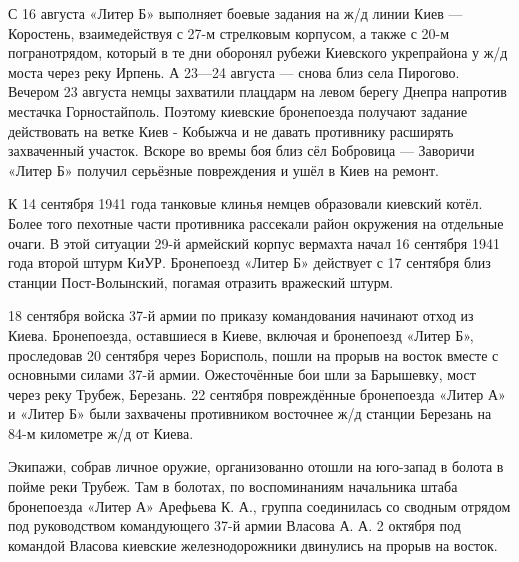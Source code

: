 С 16 августа «Литер Б» выполняет боевые задания на ж/д линии Киев — Коростень,
взаимедействуя с 27-м стрелковым корпусом, а также с 20-м погранотрядом,
который в те дни оборонял рубежи Киевского укрепрайона у ж/д моста через реку
Ирпень. А 23—24 августа — снова близ села Пирогово. Вечером 23 августа немцы
захватили плацдарм на левом берегу Днепра напротив местачка Горностайполь.
Поэтому киевские бронепоезда получают задание действовать на ветке Киев -
Кобыжча и не давать противнику расширять захваченный участок. Вскоре во времы
боя близ сёл Бобровица — Заворичи «Литер Б» получил серьёзные повреждения и
ушёл в Киев на ремонт\cite{Kajnaran2012}.

К 14 сентября 1941 года танковые клинья немцев образовали киевский котёл. Более
того пехотные части противника рассекали район окружения на отдельные очаги. В
этой ситуации 29-й армейский корпус вермахта начал 16 сентября 1941 года второй
штурм КиУР\cite{KajnaranMuravovJuschenko2017}. Бронепоезд «Литер Б» действует с
17 сентября близ станции Пост-Волынский, погамая отразить вражеский
штурм\cite{Kajnaran2012}.

18 сентября войска 37-й армии по приказу командования начинают отход из
Киева\cite{KajnaranMuravovJuschenko2017}. Бронепоезда, оставшиеся в Киеве,
включая и бронепоезд «Литер Б», проследовав 20 сентября через Борисполь, пошли
на прорыв на восток вместе с основными силами 37-й армии\cite{Kajnaran2012}.
Ожесточённые бои шли за Барышевку, мост через реку Трубеж, Березань. 22
сентября повреждённые бронепоезда «Литер А» и «Литер Б» были захвачены
противником восточнее ж/д станции Березань на 84-м километре ж/д от
Киева\cite{Kajnaran2012}.

Экипажи, собрав личное оружие, организованно отошли на юго-запад в болота в
пойме реки Трубеж. Там в болотах, по воспоминаниям начальника штаба бронепоезда
«Литер А» Арефьева К. А., группа соединилась со сводным отрядом под
руководством командующего 37-й армии Власова А. А. 2 октября под командой
Власова киевские железнодорожники двинулись на прорыв на
восток\cite{Kajnaran2012}. 
